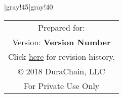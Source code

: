 \vfill
\begin{center}
\tabulinesep=2mm
  \taburulecolor |{gray!45}|{gray!40} \arrayrulewidth=1pt
\begin{tabu}{||c||}
  \hline \hline
  Prepared for: \\
  \small{Version:} \textbf{Version Number} \\
	\small
  Click {\href{https://github.com/durachain/whitepaper/commits/master}{here} for revision history.} \\
  \copyright\hspace{.25em} 2018 DuraChain, LLC\\
  For Private Use Only \\ \hline \hline
\end{tabu}

\end{center}
\vfill
